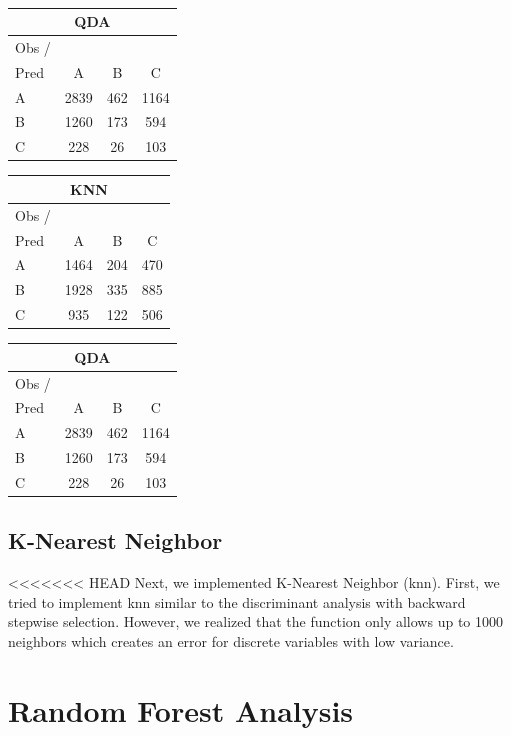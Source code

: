 \documentclass[11pt]{article}
\begin{document}
\\
\label{pred-matrix}
\begin{center}
\begin{small}
\begin{tabular}{ l | c c c}
\multicolumn{4}{c}{QDA} \\
\hline
Obs / \\ Pred & A & B &C \\
\hline
A &2839 & 462 & 1164 \\
B &1260 & 173 & 594 \\
C &228 & 26 & 103 \\
\hline
\end{tabular}
\quad
\begin{tabular}{ l | c c c}
\multicolumn{4}{c}{KNN} \\
\hline
Obs / \\ Pred & A & B &C \\
\hline
A &1464 & 204 & 470 \\
B &1928 & 335 & 885 \\
C &935 & 122 & 506 \\
\hline
\end{tabular}
\qquad
\begin{tabular}{ l | c c c}
\multicolumn{4}{c}{QDA} \\
\hline
Obs / \\ Pred & A & B &C \\
\hline
A &2839 & 462 & 1164 \\
B &1260 & 173 & 594 \\
C &228 & 26 & 103 \\
\hline
\end{tabular}
\end{small}
\end{center}

\subsection{K-Nearest Neighbor}

<<<<<<< HEAD
Next, we implemented K-Nearest Neighbor (knn). First, we tried to implement knn similar to the discriminant analysis with backward stepwise selection. However, we realized that the function only allows up to 1000 neighbors which creates an error for discrete variables with low variance.

\section{Random Forest Analysis}
\end{document}
